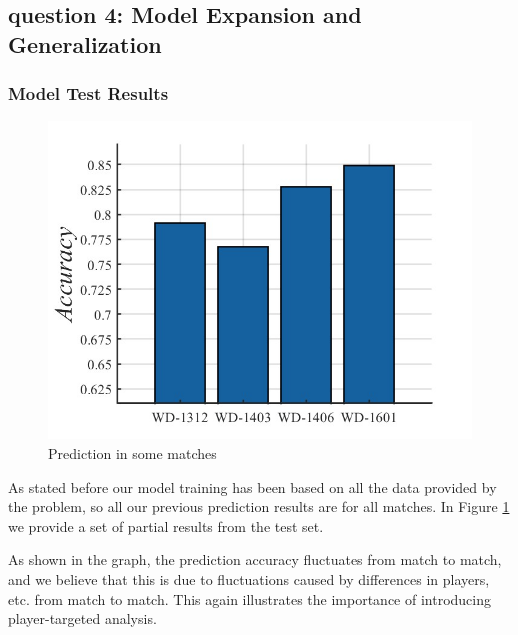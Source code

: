\subsection{question 4: Model Expansion and Generalization}
\subsubsection{Model Test Results}
\begin{figure}[bt!]
    \centering
    \includegraphics[width=0.5\linewidth]{figure/lstm4.png}
    \caption{\centering Prediction in some matches}
    \label{fig:lstm4}
\end{figure}
As stated before our model training has been based on all the data provided by the problem, so all our previous prediction results are for all matches. In Figure \ref{fig:lstm4} we provide a set of partial results from the test set.\par
As shown in the graph, the prediction accuracy fluctuates from match to match, and we believe that this is due to fluctuations caused by differences in players, etc. from match to match. This again illustrates the importance of introducing player-targeted analysis. \par


